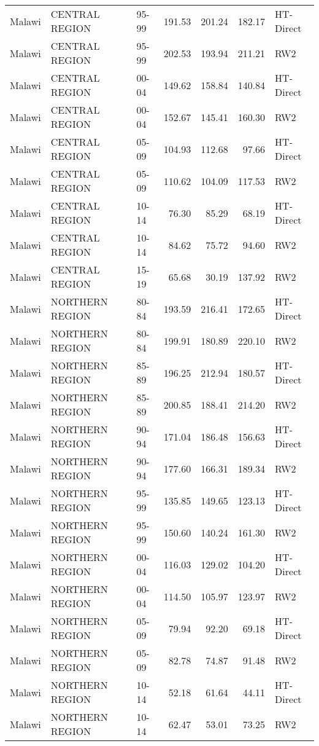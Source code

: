 \begin{longtable}{lllrrrl}
  Malawi & CENTRAL REGION & 95-99 & 191.53 & 201.24 & 182.17 & HT-Direct \\ 
  Malawi & CENTRAL REGION & 95-99 & 202.53 & 193.94 & 211.21 & RW2 \\ 
  Malawi & CENTRAL REGION & 00-04 & 149.62 & 158.84 & 140.84 & HT-Direct \\ 
  Malawi & CENTRAL REGION & 00-04 & 152.67 & 145.41 & 160.30 & RW2 \\ 
  Malawi & CENTRAL REGION & 05-09 & 104.93 & 112.68 & 97.66 & HT-Direct \\ 
  Malawi & CENTRAL REGION & 05-09 & 110.62 & 104.09 & 117.53 & RW2 \\ 
  Malawi & CENTRAL REGION & 10-14 & 76.30 & 85.29 & 68.19 & HT-Direct \\ 
  Malawi & CENTRAL REGION & 10-14 & 84.62 & 75.72 & 94.60 & RW2 \\ 
  Malawi & CENTRAL REGION & 15-19 & 65.68 & 30.19 & 137.92 & RW2 \\ 
  Malawi & NORTHERN REGION & 80-84 & 193.59 & 216.41 & 172.65 & HT-Direct \\ 
  Malawi & NORTHERN REGION & 80-84 & 199.91 & 180.89 & 220.10 & RW2 \\ 
  Malawi & NORTHERN REGION & 85-89 & 196.25 & 212.94 & 180.57 & HT-Direct \\ 
  Malawi & NORTHERN REGION & 85-89 & 200.85 & 188.41 & 214.20 & RW2 \\ 
  Malawi & NORTHERN REGION & 90-94 & 171.04 & 186.48 & 156.63 & HT-Direct \\ 
  Malawi & NORTHERN REGION & 90-94 & 177.60 & 166.31 & 189.34 & RW2 \\ 
  Malawi & NORTHERN REGION & 95-99 & 135.85 & 149.65 & 123.13 & HT-Direct \\ 
  Malawi & NORTHERN REGION & 95-99 & 150.60 & 140.24 & 161.30 & RW2 \\ 
  Malawi & NORTHERN REGION & 00-04 & 116.03 & 129.02 & 104.20 & HT-Direct \\ 
  Malawi & NORTHERN REGION & 00-04 & 114.50 & 105.97 & 123.97 & RW2 \\ 
  Malawi & NORTHERN REGION & 05-09 & 79.94 & 92.20 & 69.18 & HT-Direct \\ 
  Malawi & NORTHERN REGION & 05-09 & 82.78 & 74.87 & 91.48 & RW2 \\ 
  Malawi & NORTHERN REGION & 10-14 & 52.18 & 61.64 & 44.11 & HT-Direct \\ 
  Malawi & NORTHERN REGION & 10-14 & 62.47 & 53.01 & 73.25 & RW2 \\ 

\end{longtable}
